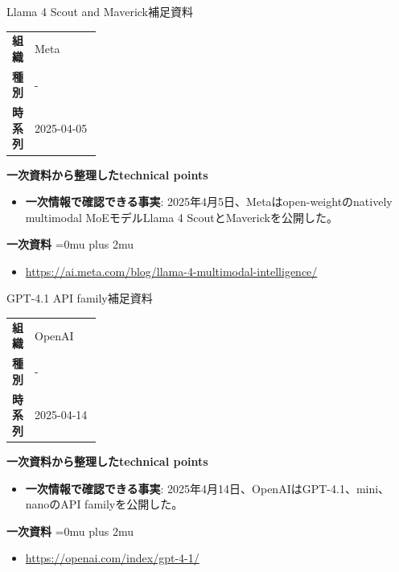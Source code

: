 \begin{technicalnote}{Llama 4 Scout and Maverick}{補足資料}
\begingroup
\begin{tabularx}{\linewidth}{@{}>{\bfseries}p{0.22\linewidth}X@{}}
組織 & Meta \\
種別 & - \\
時系列 & 2025-04-05 \\
\end{tabularx}
\smallskip
{\bfseries 一次資料から整理したtechnical points}
\begin{itemize}[leftmargin=1.5em,itemsep=0.35em]
\item \textbf{一次情報で確認できる事実}: 2025年4月5日、Metaはopen-weightのnatively multimodal MoEモデルLlama 4 ScoutとMaverickを公開した。
\end{itemize}
\begin{samepage}
{\bfseries 一次資料}
\begingroup\sloppy
\Urlmuskip=0mu plus 2mu\relax
\begin{itemize}[leftmargin=1.5em,itemsep=0.25em]
\item {\scriptsize\url{https://ai.meta.com/blog/llama-4-multimodal-intelligence/}}
\end{itemize}
\endgroup
\end{samepage}
\endgroup
\end{technicalnote}
\medskip

\begin{technicalnote}{GPT-4.1 API family}{補足資料}
\begingroup
\begin{tabularx}{\linewidth}{@{}>{\bfseries}p{0.22\linewidth}X@{}}
組織 & OpenAI \\
種別 & - \\
時系列 & 2025-04-14 \\
\end{tabularx}
\smallskip
{\bfseries 一次資料から整理したtechnical points}
\begin{itemize}[leftmargin=1.5em,itemsep=0.35em]
\item \textbf{一次情報で確認できる事実}: 2025年4月14日、OpenAIはGPT-4.1、mini、nanoのAPI familyを公開した。
\end{itemize}
\begin{samepage}
{\bfseries 一次資料}
\begingroup\sloppy
\Urlmuskip=0mu plus 2mu\relax
\begin{itemize}[leftmargin=1.5em,itemsep=0.25em]
\item {\scriptsize\url{https://openai.com/index/gpt-4-1/}}
\end{itemize}
\endgroup
\end{samepage}
\endgroup
\end{technicalnote}
\medskip

